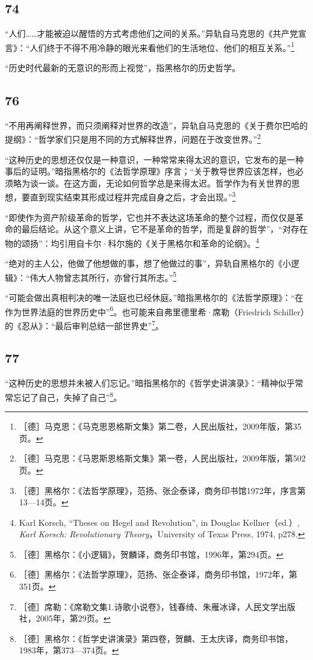 \documentclass[fontset=fandol, a4paper, 12pt, openright]{ctexbook}
\begin{document}
\subsection*{74}
“人们……才能被迫以醒悟的方式考虑他们之间的关系。”异轨自马克思的《共产党宣言》：“人们终于不得不用冷静的眼光来看他们的生活地位、他们的相互关系。”\footnote{［德］马克思：《马克思恩格斯文集》第二卷，人民出版社，2009年版，第35页。}

“历史时代最新的无意识的形而上视觉”，指黑格尔的历史哲学。

\subsection*{76}
“不用再阐释世界，而只须阐释对世界的改造”，异轨自马克思的《关于费尔巴哈的提纲》：“哲学家们只是用不同的方式解释世界，问题在于改变世界。”\footnote{［德］马克思：《马恩斯恩格斯文集》第一卷，人民出版社，2009年版，第502页。}

“这种历史的思想还仅仅是一种意识，一种常常来得太迟的意识，它发布的是一种事后的证明。”暗指黑格尔的《法哲学原理》序言；“关于教导世界应该怎样，也必须略为谈一谈。在这方面，无论如何哲学总是来得太迟。哲学作为有关世界的思想，要直到现实结束其形成过程并完成自身之后，才会出现。”\footnote{［德］黑格尔：《法哲学原理》，范扬、张企泰译，商务印书馆1972年，序言第13—14页。}

“即使作为资产阶级革命的哲学，它也并不表达这场革命的整个过程，而仅仅是革命的最后结论。从这个意义上讲，它不是革命的哲学，而是复辟的哲学”，“对存在物的颂扬”：均引用自卡尔·科尔施的《关于黑格尔和革命的论纲》。\footnote{Karl Korsch, “Theses on Hegel and Revolution”, in Douglas Kellner（ed.）, \textit{Karl Korsch: Revolutionary Theory}，University of Texas Press, 1974, p278.}

“绝对的主人公，他做了他想做的事，想了他做过的事”，异轨自黑格尔的《小逻辑》：“伟大人物曾志其所行，亦曾行其所志。”\footnote{［德］黑格尔：《小逻辑》，贺麟译，商务印书馆，1996年，第294页。}

“可能会做出真相判决的唯一法庭也已经休庭。”暗指黑格尔的《法哲学原理》：“在作为世界法庭的世界历史中”\footnote{［德］黑格尔：《法哲学原理》，范扬、张企泰译，商务印书馆，1972年，第351页。}。也可能来自弗里德里希·席勒（Friedrich Schiller）的《忍从》：“最后审判总结一部世界史”\footnote{［德］席勒：《席勒文集1.诗歌小说卷》，钱春绮、朱雁冰译，人民文学出版社，2005年，第29页。}。

\subsection*{77}
“这种历史的思想并未被人们忘记。”暗指黑格尔的《哲学史讲演录》：“精神似乎常常忘记了自己，失掉了自己”\footnote{［德］黑格尔：《哲学史讲演录》第四卷，贺麟、王太庆译，商务印书馆，1983年，第373—374页。}。
\end{document}
